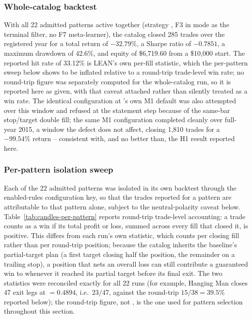 \subsubsection{Whole-catalog backtest} \label{subsec:candles-whole-catalog}

With all 22 admitted patterns active together (strategy , F3 in  mode as the terminal filter, no F7 meta-learner), the catalog closed 285 trades over the registered year for a total return of $-32.79\%$, a Sharpe ratio of $-0.7851$, a maximum drawdown of 42.6\%, and equity of \$6,719.60 from a \$10,000 start. The reported hit rate of 33.12\% is LEAN's own per-fill statistic, which the per-pattern sweep below shows to be inflated relative to a round-trip trade-level win rate; no round-trip figure was separately computed for the whole-catalog run, so it is reported here as given, with that caveat attached rather than silently treated as a win rate. The identical configuration at 's own M1 default was also attempted over this window and refused at the statement step because of the same-bar stop/target double fill; the same M1 configuration completed cleanly over full-year 2015, a window the defect does not affect, closing 1,810 trades for a $-99.54\%$ return -- consistent with, and no better than, the H1 result reported here.

\subsubsection{Per-pattern isolation sweep} \label{subsec:candles-per-pattern}

Each of the 22 admitted patterns was isolated in its own backtest through the enabled-rules configuration key, so that the trades reported for a pattern are attributable to that pattern alone, subject to the neutral-polarity caveat below. Table~\ref{tab:candles-per-pattern} reports round-trip trade-level accounting: a trade counts as a win if its total profit or loss, summed across every fill that closed it, is positive. This differs from each run's own   statistic, which counts per closing fill rather than per round-trip position; because the catalog inherits the baseline's partial-target plan (a first target closing half the position, the remainder on a trailing stop), a position that nets an overall loss can still contribute a guaranteed win to  whenever it reached its partial target before its final exit. The two statistics were reconciled exactly for all 22 runs (for example, Hanging Man closes 47 exit legs at $=0.4894$, i.e.\ $23/47$, against the round-trip $15/38=39.5\%$ reported below); the round-trip figure, not , is the one used for pattern selection throughout this section.

